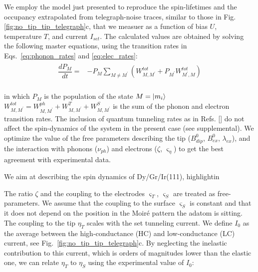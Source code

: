 \documentclass[
reprint,amsmath,amssymb,aps]{revtex4-2}
\begin{document}

We employ the model just presented to reproduce the spin-lifetimes and the occupancy extrapolated from telegraph-noise traces, similar to those in Fig. \ref{fig:no_tip_tip_telegraph}c, that we measuer as a function of bias $U$, temperature $T$, and current $I_{set}$. The calculated values are obtained by solving the following master equations, using the transition rates in Eqs.~\ref{eq:phonon_rates} and \ref{eq:elec_rates}:
\begin{align}
\begin{split}
\dfrac{dP_M}{dt}=&-P_M \sum_{M\neq M^{\prime}}\left(   W_{M,M^{\prime}}^{tot}  +P_{M^{\prime}}  W_{M^{\prime},M}^{tot}  \right) \\
\end{split}
\end{align}

in which $P_M$ is the population of the state $M=\ket{m_i}$ $W_{M,M^{\prime}}^{tot}=W_{M,M^{\prime}}^{ph}+W_{M,M^{\prime}}^{T}+W_{M,M^{\prime}}^{S}$ is the sum of the phonon and electron transition rates. The inclusion of quantum tunneling rates as in Refs. [] do not affect the spin-dynamics of the system in the present case (see supplemental).
We optimize the value of the free parameters describing the tip ($B^0_{dip}$, $B^0_{ex}$, $\lambda_{ex}$), and the interaction with phonons ($\nu_{ph}$) and electrons ($\zeta$, $\varsigma_{\eta}$) to get the best agreement with experimental data.




We aim at describing the spin dynamics of Dy/Gr/Ir(111), highlightin



The ratio $\zeta$ and the coupling to the electrodes $\varsigma_T$, $\varsigma_S$ are treated as free-parameters. We assume that the coupling to the surface $\varsigma_S$ is constant and that it does not depend on the position in the Moiré pattern the adatom is sitting. The coupling to the tip $\eta_T$ scales with the set tunneling current. We define $I_0$ as the average between the high-conductance (HC) and low-conductance (LC) current, see Fig.~\ref{fig:no_tip_tip_telegraph}c. By neglecting the inelastic contribution to this current, which is orders of magnitudes lower than the elastic one, we can relate $\eta_T$ to $\eta_S$ using the experimental value of $I_0$:
\end{document}

